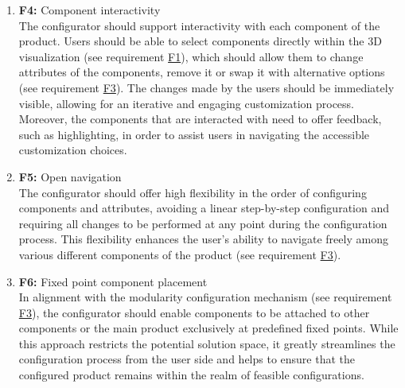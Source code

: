 \begin{enumerate}
\item \textbf{F4:} \label{itm:F4} Component interactivity
\vspace{2pt}
\\The configurator should support interactivity with each component of the product. Users should be able to select components directly within the 3D visualization (see requirement \hyperref[itm:F1]{F1}), which should allow them to change attributes of the components, remove it or swap it with alternative options (see requirement \hyperref[itm:F3]{F3}). The changes made by the users should be immediately visible, allowing for an iterative and engaging customization process. Moreover, the components that are interacted with need to offer feedback, such as highlighting, in order to assist users in navigating the accessible customization choices.
\vspace{4pt}

\item \textbf{F5:} \label{itm:F5} Open navigation
\vspace{2pt}
\\The configurator should offer high flexibility in the order of configuring components and attributes, avoiding a linear step-by-step configuration and requiring all changes to be performed at any point during the configuration process. This flexibility enhances the user's ability to navigate freely among various different components of the product (see requirement \hyperref[itm:F3]{F3}).
\vspace{4pt}

\item \textbf{F6:} \label{itm:F6} Fixed point component placement
\vspace{2pt}
\\In alignment with the modularity configuration mechanism (see requirement \hyperref[itm:F3]{F3}), the configurator should enable components to be attached to other components or the main product exclusively at predefined fixed points. While this approach restricts the potential solution space, it greatly streamlines the configuration process from the user side and helps to ensure that the configured product remains within the realm of feasible configurations.
\vspace{4pt}


\end{enumerate}
